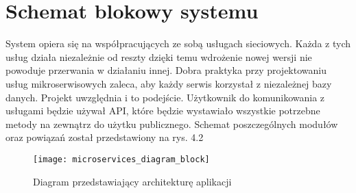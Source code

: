 \section{Schemat blokowy systemu}
\par System opiera się na współpracujących ze sobą usługach sieciowych. Każda z tych usług działa niezależnie od reszty dzięki temu wdrożenie nowej wersji nie powoduje przerwania w działaniu innej. Dobra praktyka przy projektowaniu usług mikroserwisowych zaleca, aby każdy serwis korzystał z niezależnej bazy danych. Projekt uwzględnia i to podejście. Użytkownik do komunikowania z usługami będzie używał API, które będzie wystawiało wszystkie potrzebne metody na zewnątrz do użytku publicznego. Schemat poszczególnych modułów oraz powiązań został przedstawiony na rys. 4.2 
\begin{figure}
    \caption{Diagram przedstawiający architekturę aplikacji}
    \texttt{[image: microservices\_diagram\_block]}
    \centering
\end{figure}